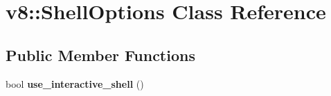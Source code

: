 \hypertarget{classv8_1_1_shell_options}{}\section{v8\+:\+:Shell\+Options Class Reference}
\label{classv8_1_1_shell_options}
\subsection*{Public Member Functions}
\begin{DoxyCompactItemize}
\item 
bool {\bfseries use\+\_\+interactive\+\_\+shell} ()\hypertarget{classv8_1_1_shell_options_a2aa12d8d13dcbb90e0d509c58a3b5669}{}\label{classv8_1_1_shell_options_a2aa12d8d13dcbb90e0d509c58a3b5669}

\end{DoxyCompactItemize}
